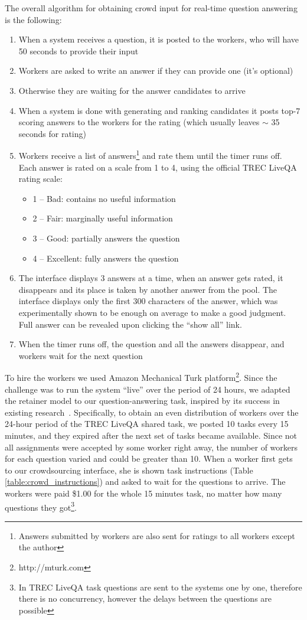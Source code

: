 \documentclass[letterpaper]{article}
\begin{document}
The overall algorithm for obtaining crowd input for real-time question answering is the following:
\begin{enumerate}
\item When a system receives a question, it is posted to the workers, who will have 50 seconds to provide their input
\item Workers are asked to write an answer if they can provide one (it's optional)
\item Otherwise they are waiting for the answer candidates to arrive
\item When a system is done with generating and ranking candidates it posts top-7 scoring answers to the workers for the rating (which usually leaves $\sim$ 35 seconds for rating)
\item Workers receive a list of answers\footnote{Answers submitted by workers are also sent for ratings to all workers except the author} and rate them until the timer runs off. Each answer is rated on a scale from 1 to 4, using the official TREC LiveQA rating scale:
	\begin{itemize}[noitemsep,topsep=0pt]
    \item 1 -- Bad: contains no useful information
    \item 2 -- Fair: marginally useful information
    \item 3 -- Good: partially answers the question
    \item 4 -- Excellent: fully answers the question
    \end{itemize}
\item The interface displays 3 answers at a time, when an answer gets rated, it disappears and its place is taken by another answer from the pool. The interface displays only the first 300 characters of the answer, which was experimentally shown to be enough on average to make a good judgment.
Full answer can be revealed upon clicking the ``show all'' link.
\item When the timer runs off, the question and all the answers disappear, and workers wait for the next question
\end{enumerate}

To hire the workers we used Amazon Mechanical Turk platform\footnote{http://mturk.com}.
Since the challenge was to run the system ``live'' over the period of 24 hours, we adapted the retainer model to our question-answering task, inspired by its success in existing research~\cite{bernstein2011crowds,bigham2010vizwiz}.
Specifically, to obtain an even distribution of workers over the 24-hour period of the TREC LiveQA shared task, we posted 10 tasks every 15 minutes, and they expired after the next set of tasks became available.
Since not all assignments were accepted by some worker right away, the number of workers for each question varied and could be greater than 10.
When a worker first gets to our crowdsourcing interface, she is shown task instructions (Table \ref{table:crowd_instructions}) and asked to wait for the questions to arrive.
The workers were paid \$1.00 for the whole 15 minutes task, no matter how many questions they got\footnote{In TREC LiveQA task questions are sent to the systems one by one, therefore there is no concurrency, however the delays between the questions are possible}.
\end{document}

